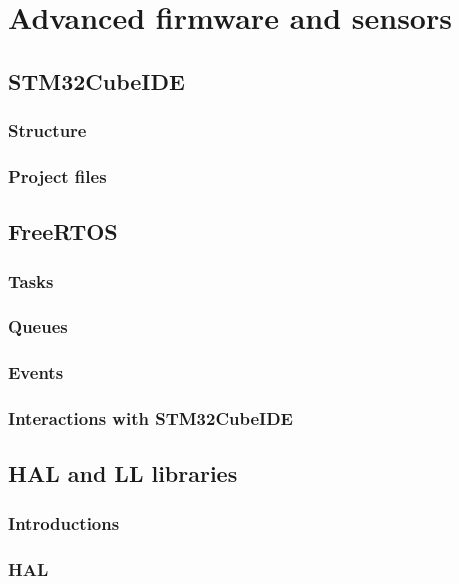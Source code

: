\documentclass[../main.tex]{subfiles}
\begin{document}

\clearpage
\thispagestyle{empty}
\vspace*{7cm}
\section{Advanced firmware and sensors}
\vspace*{1.5cm}




\subsection{STM32CubeIDE}

\subsubsection{Structure}
\subsubsection{Project files}

\subsection{FreeRTOS}

\subsubsection{Tasks}
\subsubsection{Queues}
\subsubsection{Events}
\subsubsection{Interactions with STM32CubeIDE}

\subsection{HAL and LL libraries}

\subsubsection{Introductions}
\subsubsection{HAL}
\end{document}
